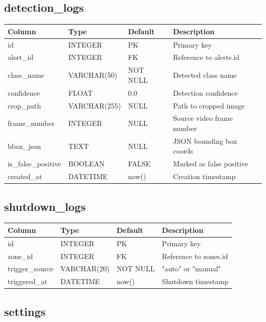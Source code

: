\documentclass[12pt,a4paper,oneside]{book}
\begin{document}
\subsection{detection\_logs}

\begin{tabular}{|l|l|l|p{6cm}|}
    \hline
    \textbf{Column} & \textbf{Type} & \textbf{Default} & \textbf{Description} \\
    \hline
    id & INTEGER & PK & Primary key \\
    \hline
    alert\_id & INTEGER & FK & Reference to alerts.id \\
    \hline
    class\_name & VARCHAR(50) & NOT NULL & Detected class name \\
    \hline
    confidence & FLOAT & 0.0 & Detection confidence \\
    \hline
    crop\_path & VARCHAR(255) & NULL & Path to cropped image \\
    \hline
    frame\_number & INTEGER & NULL & Source video frame number \\
    \hline
    bbox\_json & TEXT & NULL & JSON bounding box coords \\
    \hline
    is\_false\_positive & BOOLEAN & FALSE & Marked as false positive \\
    \hline
    created\_at & DATETIME & now() & Creation timestamp \\
    \hline
\end{tabular}

\subsection{shutdown\_logs}

\begin{tabular}{|l|l|l|p{6cm}|}
    \hline
    \textbf{Column} & \textbf{Type} & \textbf{Default} & \textbf{Description} \\
    \hline
    id & INTEGER & PK & Primary key \\
    \hline
    zone\_id & INTEGER & FK & Reference to zones.id \\
    \hline
    trigger\_source & VARCHAR(20) & NOT NULL & "auto" or "manual" \\
    \hline
    triggered\_at & DATETIME & now() & Shutdown timestamp \\
    \hline
\end{tabular}

\subsection{settings}
\end{document}
